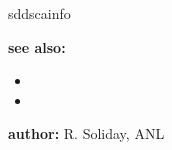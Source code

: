 \begin{sddsprog}{sddscainfo}
\item \textbf{see also:}
\begin{itemize}
  \item {}
  \item {}
\end{itemize}

\item \textbf{author:} R. Soliday, ANL
\end{sddsprog}
